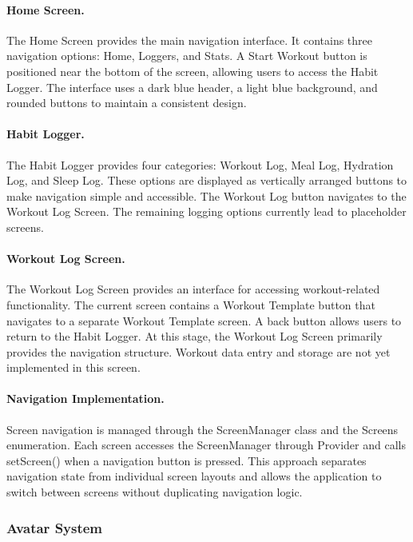 \documentclass[11pt]{article}
\begin{document}
\paragraph{Home Screen.}

The Home Screen provides the main navigation interface. It contains three navigation options: Home, Loggers, and Stats.
A Start Workout button is positioned near the bottom of the screen, allowing users to access the Habit Logger.
The interface uses a dark blue header, a light blue background, and rounded buttons to maintain a consistent design.

\paragraph{Habit Logger.}

The Habit Logger provides four categories: Workout Log, Meal Log, Hydration Log, and Sleep Log.
These options are displayed as vertically arranged buttons to make navigation simple and accessible. The Workout Log button navigates to the Workout Log Screen. The remaining logging options currently lead to placeholder screens.

\paragraph{Workout Log Screen.}

The Workout Log Screen provides an interface for accessing workout-related functionality. The current screen contains a Workout Template button that navigates to a separate Workout Template screen.
A back button allows users to return to the Habit Logger.
At this stage, the Workout Log Screen primarily provides the navigation structure. Workout data entry and storage are not yet implemented in this screen.

\paragraph{Navigation Implementation.}

Screen navigation is managed through the ScreenManager class and the Screens enumeration. Each screen accesses the ScreenManager through Provider and calls setScreen() when a navigation button is pressed.
This approach separates navigation state from individual screen layouts and allows the application to switch between screens without duplicating navigation logic.

\subsubsection{Avatar System}
\end{document}
